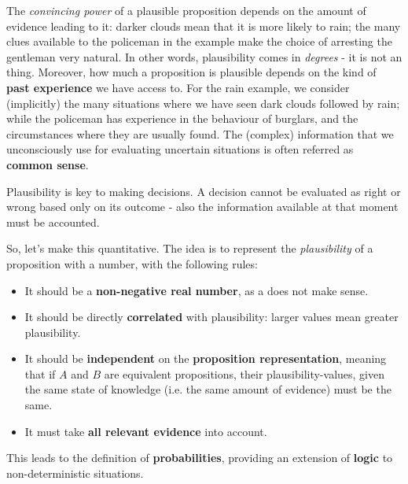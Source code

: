 \documentclass[../template.tex]{subfiles}
\begin{document}
The \textit{convincing power} of a plausible proposition depends on the amount of evidence leading to it: darker clouds mean that it is more likely to rain; the many clues available to the policeman in the example make the choice of arresting the gentleman very natural. In other words, plausibility comes in \textit{degrees} - it is not an  thing. Moreover, how much a proposition is plausible depends on the kind of \textbf{past experience} we have access to. For the rain example, we consider (implicitly) the many situations where we have seen dark clouds followed by rain; while the policeman has experience in the behaviour of burglars, and the circumstances where they are usually found. The (complex)  information that we unconsciously use for evaluating uncertain situations is often referred as \textbf{common sense}. 

\medskip

Plausibility is key to making decisions. A decision cannot be evaluated as right or wrong based only on its outcome - also the information available at that moment must be accounted. 

\medskip

So, let's make this quantitative. The idea is to represent the \textit{plausibility} of a proposition with a number, with the following rules:
\begin{itemize}
    \item It should be a \textbf{non-negative real number}, as a  does not make sense.
    \item It should be directly \textbf{correlated}  with plausibility: larger values mean greater plausibility.
    \item It should be \textbf{independent} on the \textbf{proposition representation}, meaning that if $A$ and $B$ are equivalent propositions, their plausibility-values, given the same state of knowledge (i.e. the same amount of evidence) must be the same.
    \item It must take \textbf{all relevant evidence} into account.  
\end{itemize}
This leads to the definition of \textbf{probabilities}, providing an extension of \textbf{logic} to non-deterministic situations.

\medskip
\end{document}

